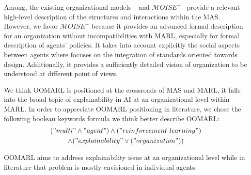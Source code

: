\documentclass[runningheads]{llncs}
\begin{document}
Among, the existing organizational models ~\cite{Ferber2004} and $\mathcal{M}OISE^+$~\cite{Hubner2002} provide a relevant high-level description of the structures and interactions within the MAS. However, we favor $\mathcal{M}OISE^+$ because it provides an advanced formal description for an organization without incompatibilities with MARL, especially for formal description of agents' policies. It takes into account explicitly the social aspects between agents where  focuses on the integration of standards oriented towards design. Additionally, it provides a sufficiently detailed vision of organization to be understood at different point of views.

We think OOMARL is positioned at the crossroads of MAS and MARL, it falls into the broad topic of explainability in AI at an organizational level within MARL. In order to appreciate OOMARL positioning in literature, we chose the following boolean keywords formula we think better describe OOMARL:
\begin{gather*}
    ("multi" \land "agent") \land ("reinforcement \ learning")\\ \land ("explainability" \lor ("organization"))
\end{gather*}

OOMARL aims to address explainability issue at an organizational level while in literature that problem is mostly envisioned in individual agents. 
\end{document}
